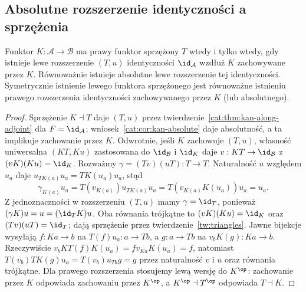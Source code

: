 \subsection{Absolutne rozszerzenie identyczności a sprzężenia}
\begin{twierdzenie}\label{cat:thm:kan-adjoint-criterion}
Funktor $K:\mathcal A\to\mathcal B$ ma prawy funktor sprzężony $T$ wtedy i tylko wtedy, gdy istnieje lewe rozszerzenie $(T,u)$ identyczności $\id_{\mathcal A}$ wzdłuż $K$ zachowywane przez $K$. Równoważnie istnieje absolutne lewe rozszerzenie tej identyczności. Symetrycznie istnienie lewego funktora sprzężonego jest równoważne istnieniu prawego rozszerzenia identyczności zachowywanego przez $K$ (lub absolutnego).
\end{twierdzenie}
\begin{proof}
Sprzężenie $K\dashv T$ daje $(T,u)$ przez twierdzenie~\ref{cat:thm:kan-along-adjoint} dla $F=\id_{\mathcal A}$; wniosek~\ref{cat:cor:kan-absolute} daje absolutność, a ta implikuje zachowanie przez $K$. Odwrotnie, jeśli $K$ zachowuje $(T,u)$, własność uniwersalna $(KT,Ku)$ zastosowana do $\id_{\mathcal B}$ i $\id_K$ daje $v:KT\to\id_{\mathcal B}$ z $(vK)(Ku)=\id_K$. Rozważmy $\gamma=(Tv)(uT):T\to T$. Naturalność $u$ względem $u_a$ daje $u_{TK(a)}u_a=TK(u_a)u_a$, stąd
\[
 \gamma_{K(a)}u_a=T(v_{K(a)})u_{TK(a)}u_a
 =T(v_{K(a)}K(u_a))u_a=u_a.
\]
Z jednoznaczności w rozszerzeniu $(T,u)$ mamy $\gamma=\id_T$, ponieważ $(\gamma K)u=u=(\id_T K)u$. Oba równania trójkątne to $(vK)(Ku)=\id_K$ oraz $(Tv)(uT)=\id_T$; dają sprzężenie przez twierdzenie~\ref{tw:triangles}. Jawne bijekcje wysyłają $f:Ka\to b$ na $T(f)u_a:a\to Tb$, a $g:a\to Tb$ na $v_bK(g):Ka\to b$. Rzeczywiście $v_bKT(f)K(u_a)=f v_{Ka}K(u_a)=f$, natomiast $T(v_b)TK(g)u_a=T(v_b)u_{Tb}g=g$ przez naturalność $v$ i $u$ oraz równania trójkątne. Dla prawego rozszerzenia stosujemy lewą wersję do $K^{\op}$: zachowanie przez $K$ odpowiada zachowaniu przez $K^{\op}$, a $K^{\op}\dashv T^{\op}$ odpowiada $T\dashv K$.
\end{proof}

